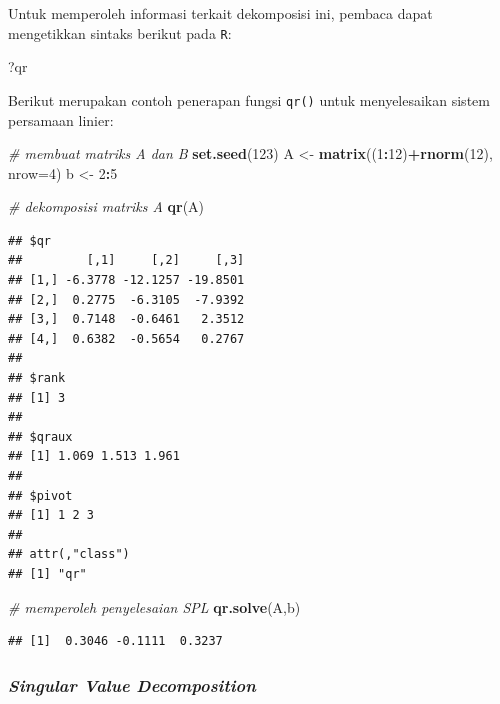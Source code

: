 \documentclass[]{book}
\newenvironment{Shaded}{\begin{snugshade}}{\end{snugshade}}
\newcommand{\CommentTok}[1]{\textcolor[rgb]{0.56,0.35,0.01}{\textit{#1}}}
\newcommand{\DataTypeTok}[1]{\textcolor[rgb]{0.13,0.29,0.53}{#1}}
\newcommand{\DecValTok}[1]{\textcolor[rgb]{0.00,0.00,0.81}{#1}}
\newcommand{\KeywordTok}[1]{\textcolor[rgb]{0.13,0.29,0.53}{\textbf{#1}}}
\newcommand{\NormalTok}[1]{#1}
\newcommand{\OperatorTok}[1]{\textcolor[rgb]{0.81,0.36,0.00}{\textbf{#1}}}
\newcommand{\StringTok}[1]{\textcolor[rgb]{0.31,0.60,0.02}{#1}}
\theoremstyle{definition}
\theoremstyle{definition}
\theoremstyle{definition}
\theoremstyle{remark}
\begin{document}
Untuk memperoleh informasi terkait dekomposisi ini, pembaca dapat mengetikkan sintaks berikut pada \texttt{R}:

\begin{Shaded}
\begin{Highlighting}[]
\NormalTok{?qr}
\end{Highlighting}
\end{Shaded}

Berikut merupakan contoh penerapan fungsi \texttt{qr()} untuk menyelesaikan sistem persamaan linier:

\begin{Shaded}
\begin{Highlighting}[]
\CommentTok{# membuat matriks A dan B}
\KeywordTok{set.seed}\NormalTok{(}\DecValTok{123}\NormalTok{)}
\NormalTok{A <-}\StringTok{ }\KeywordTok{matrix}\NormalTok{((}\DecValTok{1}\OperatorTok{:}\DecValTok{12}\NormalTok{)}\OperatorTok{+}\KeywordTok{rnorm}\NormalTok{(}\DecValTok{12}\NormalTok{), }\DataTypeTok{nrow=}\DecValTok{4}\NormalTok{)}
\NormalTok{b <-}\StringTok{ }\DecValTok{2}\OperatorTok{:}\DecValTok{5}

\CommentTok{# dekomposisi matriks A}
\KeywordTok{qr}\NormalTok{(A)}
\end{Highlighting}
\end{Shaded}

\begin{verbatim}
## $qr
##         [,1]     [,2]     [,3]
## [1,] -6.3778 -12.1257 -19.8501
## [2,]  0.2775  -6.3105  -7.9392
## [3,]  0.7148  -0.6461   2.3512
## [4,]  0.6382  -0.5654   0.2767
## 
## $rank
## [1] 3
## 
## $qraux
## [1] 1.069 1.513 1.961
## 
## $pivot
## [1] 1 2 3
## 
## attr(,"class")
## [1] "qr"
\end{verbatim}

\begin{Shaded}
\begin{Highlighting}[]
\CommentTok{# memperoleh penyelesaian SPL}
\KeywordTok{qr.solve}\NormalTok{(A,b)}
\end{Highlighting}
\end{Shaded}

\begin{verbatim}
## [1]  0.3046 -0.1111  0.3237
\end{verbatim}

\hypertarget{svddecomp}{%
\subsubsection{\texorpdfstring{\emph{Singular Value Decomposition}}{Singular Value Decomposition}}\label{svddecomp}}
\end{document}
